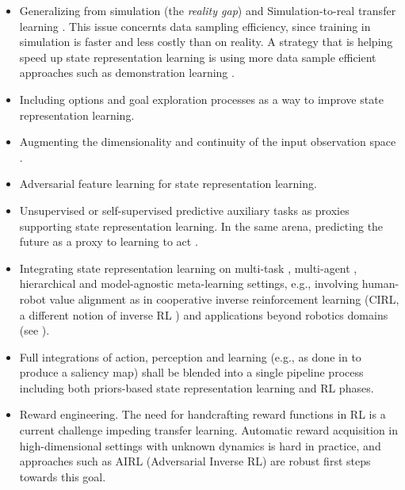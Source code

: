 \documentclass[a4paper]{article}
\begin{document}
\begin{itemize}
\item Generalizing from simulation \cite{Peng17} (the \textit{reality gap}) and  Simulation-to-real transfer learning \cite{Tobin17,Peng17}. This issue concernts data sampling efficiency, since training in simulation is faster and less costly than on reality. A strategy that is helping speed up state representation learning is using more data sample efficient approaches such as demonstration learning \cite{Hester17}.

\item Including options \cite{Machado17a} and goal exploration processes \cite{Forestier17} as a way to improve state representation learning. %
\item Augmenting the dimensionality and continuity of the input observation space \cite{Lesort17}.
\item Adversarial feature learning \cite{Donahue16, Fu17} for state representation learning.
\item Unsupervised \cite{Jaderberg16} or self-supervised predictive \cite{Shelhamer17} auxiliary tasks as proxies supporting state representation learning. In the same arena, predicting the future as a proxy to learning to act \cite{Dosovitskiy16, Oh17}.
\item Integrating state representation learning on multi-task \cite{Kulkarni16, Andreas17, Wilson07,Teh17}, multi-agent \cite{Foerster16,Foerster17}, hierarchical \cite{Wilson07} and model-agnostic meta-learning \cite{Finn17Model} settings, e.g., involving human-robot value alignment as in cooperative inverse reinforcement learning (CIRL, a different notion of inverse RL \cite{Hadfield16}) and applications beyond robotics domains (see \cite{Li17,Kaelbling96}).
\item Full integrations of action, perception and learning (e.g., as done in \cite{LeGoff17} to produce a saliency map) shall be blended into a single pipeline process including both priors-based state representation learning and RL phases. 

\item Reward engineering. The need for handcrafting reward functions in RL is a current challenge impeding transfer learning. Automatic reward acquisition in high-dimensional settings with unknown dynamics is hard in practice, and approaches such as AIRL (Adversarial Inverse RL) are robust first steps \cite{Fu17} towards this goal.


\end{itemize}
\end{document}
